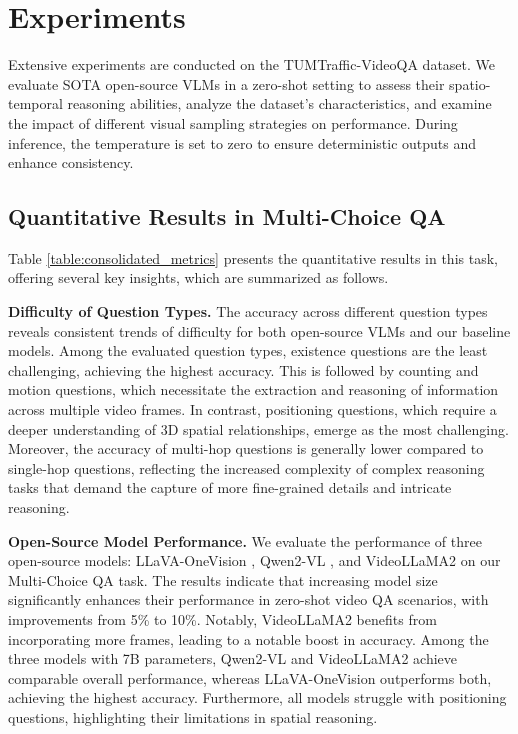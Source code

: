 

\section{Experiments}
Extensive experiments are conducted on the TUMTraffic-VideoQA dataset. We evaluate SOTA open-source VLMs in a zero-shot setting to assess their spatio-temporal reasoning abilities, analyze the dataset’s characteristics, and examine the impact of different visual sampling strategies on performance. During inference, the temperature is set to zero to ensure deterministic outputs and enhance consistency.




\subsection{Quantitative Results in Multi-Choice QA}
Table \ref{table:consolidated_metrics} presents the quantitative results in this task, offering several key insights, which are summarized as follows.

\noindent\textbf{Difficulty of Question Types.} The accuracy across different question types reveals consistent trends of difficulty for both open-source VLMs and our baseline models. Among the evaluated question types, existence questions are the least challenging, achieving the highest accuracy. This is followed by counting and motion questions, which necessitate the extraction and reasoning of information across multiple video frames. In contrast, positioning questions, which require a deeper understanding of 3D spatial relationships, emerge as the most challenging. Moreover, the accuracy of multi-hop questions is generally lower compared to single-hop questions, reflecting the increased complexity of complex reasoning tasks that demand the capture of more fine-grained details and intricate reasoning. 
 


\noindent\textbf{Open-Source Model Performance.} We evaluate the performance of three open-source models: LLaVA-OneVision \cite{li2024llavaonevisioneasyvisualtask}, Qwen2-VL \cite{Qwen-VL}, and VideoLLaMA2 \cite{cheng2024videollama2advancingspatialtemporal} on our Multi-Choice QA task. The results indicate that increasing model size significantly enhances their performance in zero-shot video QA scenarios, with improvements from 5\% to 10\%. Notably, VideoLLaMA2 benefits from incorporating more frames, leading to a notable boost in accuracy. Among the three models with 7B parameters, Qwen2-VL and VideoLLaMA2 achieve comparable overall performance, whereas LLaVA-OneVision outperforms both, achieving the highest accuracy. Furthermore, all models struggle with positioning questions, highlighting their limitations in spatial reasoning. 

